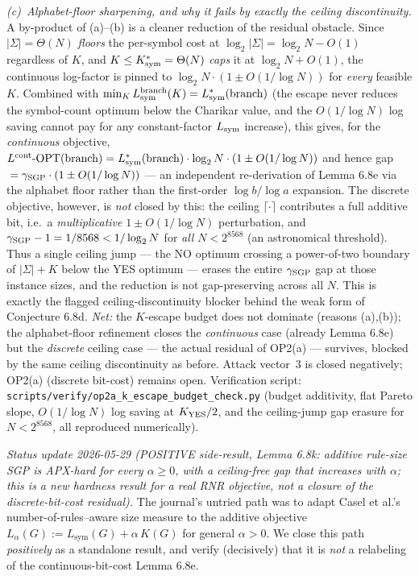 \documentclass[
]{article}
\begin{document}
\emph{(c)~Alphabet-floor sharpening, and why it fails by exactly the
ceiling discontinuity.} A by-product of (a)--(b) is a cleaner
reduction of the residual obstacle. Since $|\Sigma| = \Theta(N)$
\emph{floors} the per-symbol cost at $\log_2|\Sigma| = \log_2 N -
O(1)$ regardless of $K$, and $K \leq K^*_{\rm sym} = \Theta(N)$
\emph{caps} it at $\log_2 N + O(1)$, the continuous log-factor is
pinned to $\log_2 N \cdot (1 \pm O(1/\log N))$ for \emph{every}
feasible $K$. Combined with $\min_K L_{\rm sym}^{\rm branch}(K) =
L^*_{\rm sym}({\rm branch})$ (the escape never reduces the
symbol-count optimum below the Charikar value, and the $O(1/\log N)$
log saving cannot pay for any constant-factor $L_{\rm sym}$
increase), this gives, for the \emph{continuous} objective,
$L^{\rm cont}\text{-OPT}({\rm branch}) = L^*_{\rm sym}({\rm branch})
\cdot \log_2 N \cdot (1 \pm O(1/\log N))$ and hence
gap${} = \gamma_{\rm SGP} \cdot (1 \pm O(1/\log N))$ --- an
independent re-derivation of Lemma 6.8e via the alphabet floor rather
than the first-order $\log b / \log a$ expansion. The discrete
objective, however, is \emph{not} closed by this: the ceiling
$\lceil \cdot \rceil$ contributes a full additive bit, i.e.\ a
\emph{multiplicative} $1 \pm O(1/\log N)$ perturbation, and
$\gamma_{\rm SGP} - 1 = 1/8568 < 1/\log_2 N$ for \emph{all} $N <
2^{8568}$ (an astronomical threshold). Thus a single ceiling jump ---
the NO optimum crossing a power-of-two boundary of $|\Sigma| + K$
below the YES optimum --- erases the entire $\gamma_{\rm SGP}$ gap at
those instance sizes, and the reduction is not gap-preserving across
all $N$. This is exactly the flagged ceiling-discontinuity
blocker behind the weak form of Conjecture 6.8d. \emph{Net:} the
$K$-escape budget does not dominate (reasons (a),(b)); the
alphabet-floor refinement closes the \emph{continuous} case (already
Lemma 6.8e) but the \emph{discrete} ceiling case --- the actual
residual of OP2(a) --- survives, blocked by the same ceiling
discontinuity as before. Attack vector~3 is closed negatively;
OP2(a) (discrete bit-cost) remains open. Verification script:
\texttt{scripts/verify/op2a\_k\_escape\_budget\_check.py} (budget
additivity, flat Pareto slope, $O(1/\log N)$ log saving at $K_{\rm
YES}/2$, and the ceiling-jump gap erasure for $N < 2^{8568}$,
all reproduced numerically).

\emph{Status update 2026-05-29 (POSITIVE side-result, Lemma 6.8k:
additive rule-size SGP is APX-hard for every $\alpha \geq 0$, with a
ceiling-free gap that \emph{increases} with $\alpha$; this is a new
hardness result for a real RNR objective, not a closure of the
discrete-bit-cost residual).} The journal's untried path was to adapt
Casel et al.'s number-of-rules--aware size measure to the additive
objective $L_\alpha(G) := L_{\mathrm{sym}}(G) + \alpha\,K(G)$ for general
$\alpha > 0$. We close this path \emph{positively} as a standalone
result, and verify (decisively) that it is \emph{not} a relabeling of
the continuous-bit-cost Lemma 6.8e.
\end{document}
